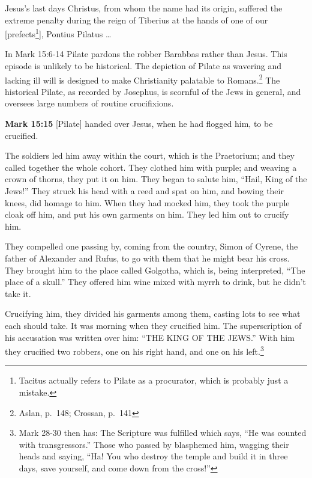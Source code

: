 \documentclass[10pt,twoside]{article} %
\newcommand{\doimage}[2]{\texttt{[image: \#2]}\label{fig:#2}}
\newcommand{\figbasic}[4]{ %
    \ifthenelse{\isodd{\pageref{fig:#2}}}{}{\hfill}
    \ifstrempty{#3}{
      \doimage{#1}{#2}
    }{
      \makebox{\doimage{#1}{#2} \\ #3}
    }
    \ifthenelse{\isodd{\pageref{fig:#2}}}{\hfill}{}
    \par
}
\newcommand{\fig}[2][0.4]{
  \figbasic{#1}{#2}{}{}
}
\newcommand{\quotesize}{\normalsize{}}
\newcommand{\comm}[1]{\begingroup \color{black!50} #1\endgroup}
\newenvironment{quotetext}{\begingroup\quotesize}{\endgroup}
\newcommand{\intex}[1]{\index[texts]{#1}}
\newcommand{\bible}[2]{\begin{quotetext}\textbf{#1}\intex{#1} #2\end{quotetext}}
\newcommand{\gospelmark}[2]{\bible{Mark #1}{#2}}
\begin{document}
\begin{section}{Jesus's last days}
\begin{quotetext}
Christus, from whom the name had its origin, suffered
the extreme penalty during the reign of Tiberius at the hands of one
of our [prefects\footnote{Tacitus actually refers to Pilate as a procurator, which is probably just a mistake.}], Pontius Pilatus \ldots
\end{quotetext}


\comm{In Mark 15:6-14 Pilate pardons the robber Barabbas rather than Jesus. This episode is unlikely to be historical.
The depiction of Pilate as wavering and lacking ill will is designed to make Christianity palatable to Romans.\footnote{Aslan, p.~148; Crossan,
p.~141} The historical Pilate, as recorded by Josephus, is scornful of the Jews in general, and oversees large numbers
of routine crucifixions.
}

\fig{ecce-homo}

\gospelmark{15:15}{
[Pilate] handed over Jesus, when he had flogged him, to be crucified.

  The soldiers led him away within the court, which is the Praetorium; and they called together the whole cohort.   They clothed him with purple; and weaving a crown of thorns, they put it on him.   They began to salute him, ``Hail, King of the Jews!''   They struck his head with a reed and spat on him, and bowing their knees, did homage to him.   When they had mocked him, they took the purple cloak off him, and put his own garments on him. They led him out to crucify him.

  They compelled one passing by, coming from the country, Simon of Cyrene, the father of Alexander and Rufus, to go with them that he might bear his cross.   They brought him to the place called Golgotha, which is, being interpreted, ``The place of a skull.''   They offered him wine mixed with myrrh to drink, but he didn't take it.

  Crucifying him, they divided his garments among them, casting lots to see what each should take.   
It was morning when they crucified him.   The superscription of his accusation was written over him: ``THE KING OF THE JEWS.''   With him they crucified two robbers, one on his right hand, and one on his left.\footnote{Mark 28-30 then has: The Scripture was fulfilled which says, 
``He was counted with transgressors.'' Those who passed by blasphemed him, wagging their heads and saying, ``Ha! You who destroy the temple and build it in three days,   save yourself, and come down from the cross!''}
}


\end{section}
\end{document}
